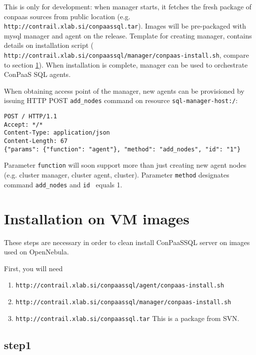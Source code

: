 \documentclass[a4paper,10pt]{article}
\begin{document}
This is only for development: when manager starts, it fetches the fresh package of conpaas sources from public location (e.g. \\{\tt http://contrail.xlab.si/conpaassql.tar}). Images will be pre-packaged with mysql manager and agent on the release. Template for creating manager, contains details on installation script (\\{\tt http://contrail.xlab.si/conpaassql/manager/conpaas-install.sh}, compare to section \ref{sec:install}). When installation is complete, manager can be used to orchestrate ConPaaS SQL agents.

When obtaining access point of the manager, new agents can be provisioned by issuing HTTP POST {\tt add\_nodes} command on resource {\tt sql-manager-host:/}:

\begin{verbatim}
POST / HTTP/1.1
Accept: */*
Content-Type: application/json
Content-Length: 67
{"params": {"function": "agent"}, "method": "add_nodes", "id": "1"}
\end{verbatim}

Parameter {\tt function} will soon support more than just creating new agent nodes (e.g. cluster manager, cluster agent, cluster). Parameter {\tt method} designates command {\tt add\_nodes} and {\tt id } equals 1. 

\section{Installation on VM images}
\label{sec:install}

These steps are necessary in order to clean install ConPaaSSQL server on images used on OpenNebula.

First, you will need
\begin{enumerate}
\item {\tt http://contrail.xlab.si/conpaassql/agent/conpaas-install.sh}
\item {\tt http://contrail.xlab.si/conpaassql/manager/conpaas-install.sh}
\item {\tt http://contrail.xlab.si/conpaassql.tar} This is a package from SVN.
\end{enumerate}

\subsection*{step1}
\end{document}
